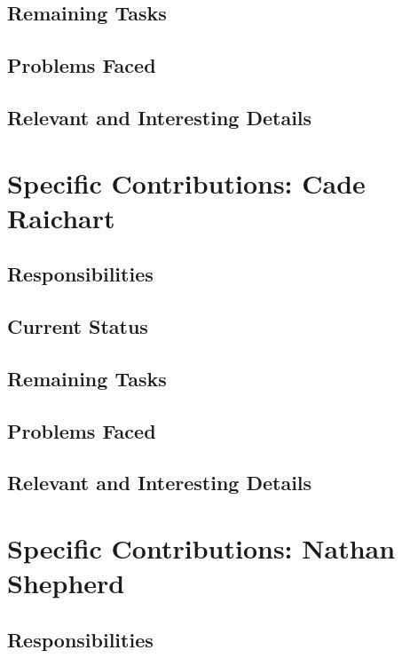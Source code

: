 \documentclass[onecolumn, draftclsnofoot,10pt, compsoc]{IEEEtran}
\begin{document}
\subsection{Remaining Tasks}
\subsection{Problems Faced}
\subsection{Relevant and Interesting Details}

\section{Specific Contributions: Cade Raichart}
\subsection{Responsibilities}
\subsection{Current Status}
\subsection{Remaining Tasks}
\subsection{Problems Faced}
\subsection{Relevant and Interesting Details}

\section{Specific Contributions: Nathan Shepherd}

\subsection{Responsibilities}
\end{document}
